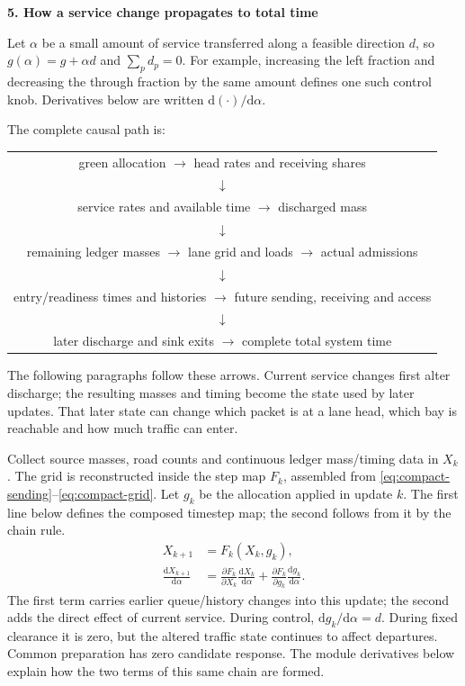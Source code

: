 \documentclass[10pt,a4paper]{article}
\newcommand{\head}[1]{\par\vspace{4pt}\noindent\textbf{#1}\par\nobreak\vspace{1pt}}
\begin{document}
\head{5. How a service change propagates to total time}
Let $\alpha$ be a small amount of service transferred along a feasible
direction $d$, so $g(\alpha)=g+\alpha d$ and $\sum_p d_p=0$.
For example, increasing the left fraction and decreasing the through
fraction by the same amount defines one such control knob. Derivatives
below are written $\mathrm d(\cdot)/\mathrm d\alpha$.

The complete causal path is:
\begin{center}
\begin{tabular}{c}
green allocation $\longrightarrow$ head rates and receiving shares\\
$\downarrow$\\
service rates and available time $\longrightarrow$ discharged mass\\
$\downarrow$\\
remaining ledger masses $\longrightarrow$ lane grid and loads
$\longrightarrow$ actual admissions\\
$\downarrow$\\
entry/readiness times and histories $\longrightarrow$ future sending,
receiving and access\\
$\downarrow$\\
later discharge and sink exits $\longrightarrow$ complete total system time
\end{tabular}
\end{center}
The following paragraphs follow these arrows. Current service changes
first alter discharge; the resulting masses and timing become the state
used by later updates. That later state can change which packet is at a
lane head, which bay is reachable and how much traffic can enter.

Collect source masses, road counts and continuous ledger mass/timing data
in $X_k$. The grid is reconstructed inside the step map $F_k$, assembled
from \eqref{eq:compact-sending}--\eqref{eq:compact-grid}.
Let $g_k$ be the allocation applied in update $k$.
The first line below defines the composed timestep map; the second follows from it by the chain rule.
\begin{equation}
 \begin{aligned}
 X_{k+1}&=F_k(X_k,g_k),\\
 \frac{\mathrm dX_{k+1}}{\mathrm d\alpha}
 &=\frac{\partial F_k}{\partial X_k}
       \frac{\mathrm dX_k}{\mathrm d\alpha}
  +\frac{\partial F_k}{\partial g_k}
       \frac{\mathrm dg_k}{\mathrm d\alpha}.
 \end{aligned}
 \label{eq:compact-chain}
\end{equation}
The first term carries earlier queue/history changes into this update;
the second adds the direct effect of current service. During control,
$\mathrm dg_k/\mathrm d\alpha=d$. During fixed clearance it is zero,
but the altered traffic state continues to affect departures.
Common preparation has zero candidate response. The module derivatives
below explain how the two terms of this same chain are formed.
\end{document}
